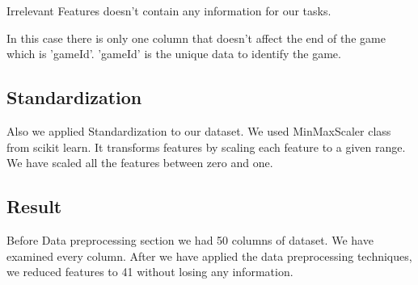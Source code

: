 \documentclass[a4paper]{article}
\begin{document}
Irrelevant Features doesn't contain any information for our tasks.

\medskip

In this case there is only one column that doesn't affect the end of the game which is 'gameId'. 'gameId' is the unique data to identify the game.


\bigskip 

\subsection{Standardization}
Also we applied Standardization to our dataset. We used MinMaxScaler class from scikit learn. It transforms features by scaling each feature to a given range. We have scaled all the features between zero and one.


\subsection{Result}

Before Data preprocessing section we had 50 columns of dataset. We have examined every column. 
After we have applied the data preprocessing techniques, we reduced features to 41 without losing any information. 
\pagebreak

\end{document}
